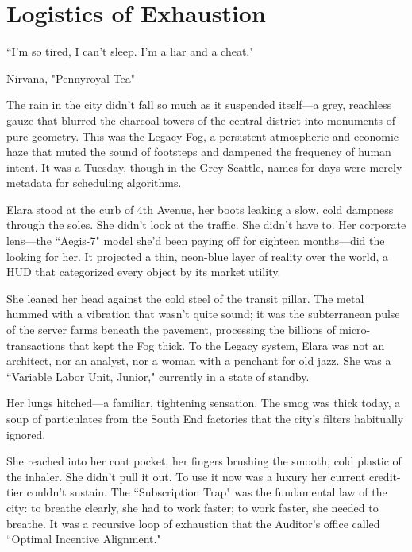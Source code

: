 
\chapter{Logistics of Exhaustion}
\epigraph{``I'm so tired, I can't sleep. I'm a liar and a cheat."}{Nirvana, "Pennyroyal Tea"}

The rain in the city didn't fall so much as it suspended itself—a grey, reachless gauze that blurred the charcoal towers of the central district into monuments of pure geometry. This was the Legacy Fog, a persistent atmospheric and economic haze that muted the sound of footsteps and dampened the frequency of human intent. It was a Tuesday, though in the Grey Seattle, names for days were merely metadata for scheduling algorithms.

Elara stood at the curb of 4th Avenue, her boots leaking a slow, cold dampness through the soles. She didn't look at the traffic. She didn't have to. Her corporate lens—the ``Aegis-7" model she’d been paying off for eighteen months—did the looking for her. It projected a thin, neon-blue layer of reality over the world, a HUD that categorized every object by its market utility.


She leaned her head against the cold steel of the transit pillar. The metal hummed with a vibration that wasn't quite sound; it was the subterranean pulse of the server farms beneath the pavement, processing the billions of micro-transactions that kept the Fog thick. To the Legacy system, Elara was not an architect, nor an analyst, nor a woman with a penchant for old jazz. She was a ``Variable Labor Unit, Junior," currently in a state of standby.

Her lungs hitched—a familiar, tightening sensation. The smog was thick today, a soup of particulates from the South End factories that the city’s filters habitually ignored. 


She reached into her coat pocket, her fingers brushing the smooth, cold plastic of the inhaler. She didn't pull it out. To use it now was a luxury her current credit-tier couldn't sustain. The ``Subscription Trap" was the fundamental law of the city: to breathe clearly, she had to work faster; to work faster, she needed to breathe. It was a recursive loop of exhaustion that the Auditor’s office called ``Optimal Incentive Alignment."

